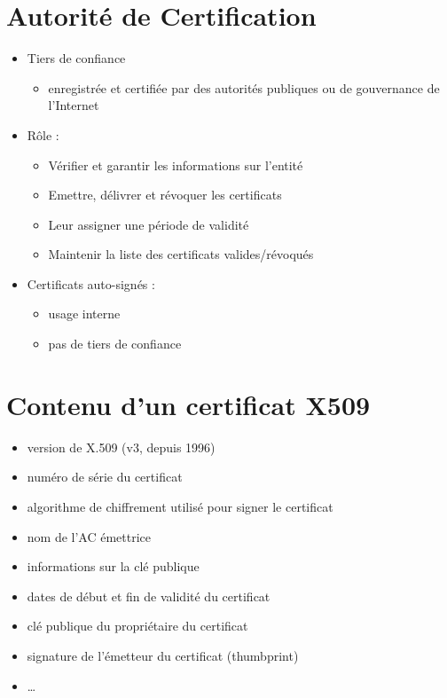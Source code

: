 \hypertarget{autorituxe9-de-certification}{%
\section{Autorité de Certification}\label{autorituxe9-de-certification}}

\begin{itemize}
\tightlist
\item
  Tiers de confiance

  \begin{itemize}
  \tightlist
  \item
    enregistrée et certifiée par des autorités publiques ou de
    gouvernance de l'Internet
  \end{itemize}
\item
  Rôle :

  \begin{itemize}
  \tightlist
  \item
    Vérifier et garantir les informations sur l'entité
  \item
    Emettre, délivrer et révoquer les certificats
  \item
    Leur assigner une période de validité
  \item
    Maintenir la liste des certificats valides/révoqués
  \end{itemize}
\item
  Certificats auto-signés :

  \begin{itemize}
  \tightlist
  \item
    usage interne
  \item
    pas de tiers de confiance
  \end{itemize}
\end{itemize}

\hypertarget{contenu-dun-certificat-x509}{%
\section{Contenu d'un certificat
X509}\label{contenu-dun-certificat-x509}}

\begin{itemize}
\tightlist
\item
  version de X.509 (v3, depuis 1996)
\item
  numéro de série du certificat
\item
  algorithme de chiffrement utilisé pour signer le certificat
\item
  nom de l'AC émettrice
\item
  informations sur la clé publique
\item
  dates de début et fin de validité du certificat
\item
  clé publique du propriétaire du certificat
\item
  signature de l'émetteur du certificat (thumbprint)
\item
  \ldots{}
\end{itemize}

